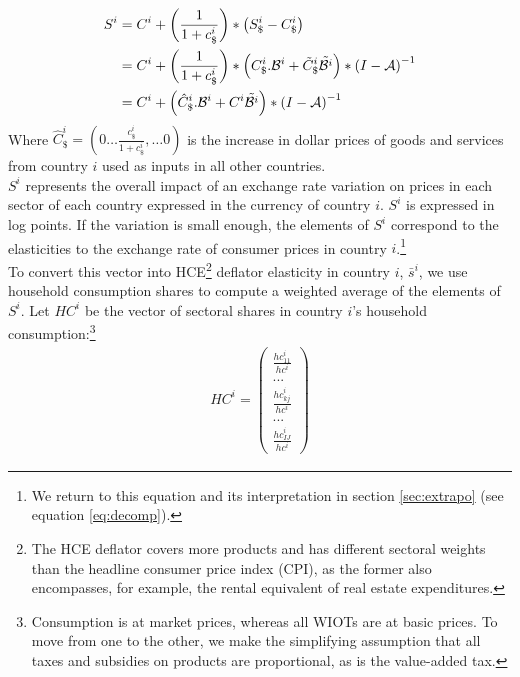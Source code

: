 \documentclass[11pt,a4paper]{paper} %
\begin{document}
\begin{equation}
\begin{aligned}
	S^i&=C^i  + \left( \frac{1}{1+{{c}_\$^i}}\right)*\left({S_\$^i}-{{C}_{\$}^i}\right)\\
	&=C^i + \left( \frac{1}{1+{{c}_\$^i}}\right)*\left(C_\$^i.{\cal B}^i+{\tilde{C}_\$^i}{\tilde{{\cal B}^i}}\right)*{{(I-{\cal A})}^{-1}} 	\\
	&=C^i	+ \left(\hat{C}^i_\$.{\cal B}^i+{C^i}{\tilde{{\cal B}^i}}\right)*{{(I-{\cal A})}^{-1}}	
\label{eq:eqdomcurrency}
\end{aligned}
\end{equation}
Where $\hat{C}^i_\$=\left(0 \ldots \frac{c_\$^i}{1+c_\$^i},\ldots 0 \right)$ is the increase in dollar prices of goods and services from country $i$ used as inputs in all other countries.\\ 
$S^i$ represents the overall impact of an exchange rate variation on prices in each sector of each country expressed in the currency of country $i$. $S^i$ is expressed in log points. If the variation is small enough, the elements of $S^i$ correspond to the elasticities to the exchange rate of consumer prices in country $i$.\footnote{We return to this equation and its interpretation in section \ref{sec:extrapo} (see equation \ref{eq:decomp}).}\\
To convert this vector into HCE\footnote{The HCE deflator covers more products and has different sectoral weights than the headline consumer price index (CPI), as the former also encompasses, for example, the rental equivalent of real estate expenditures.}
 deflator elasticity in country $i$, $\bar{s}^i$, we use household consumption shares to compute a weighted average of the elements of $S^i$. Let $HC^i$ be the vector of sectoral shares in country $i$'s household consumption:\footnote{Consumption is at market prices, whereas all WIOTs are at basic prices. To move from one to the other, we make the simplifying assumption that all taxes and subsidies on products are proportional, as is the value-added tax.}
\begin{eqnarray*}
HC^i=\left( 
	\begin{array}{c}
	\frac{{hc}_{11}^i}{hc^i} \\
	...\\
	\frac{{hc}_{kj}^i}{hc^i}\\
	...\\
	\frac{{hc}_{IJ}^i}{hc^i}
	 \end{array}
	 \right)
\end{eqnarray*}
\end{document}
